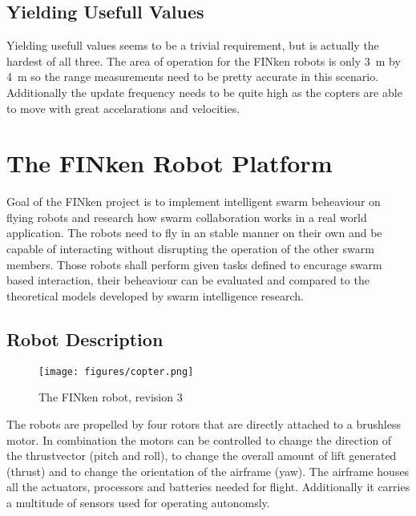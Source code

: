 \subsection{Yielding Usefull Values}
\label{req3}
Yielding usefull values seems to be a trivial requirement, but is actually the hardest of all three.
The area of operation for the FINken robots is only \SI{3}{m} by \SI{4}{m} so the range measurements need to be pretty accurate in this scenario. 
Additionally the update frequency needs to be quite high as the copters are able to move with great accelarations and velocities.


\section{The FINken Robot Platform}


Goal of the FINken project is to implement intelligent swarm beheaviour on flying robots and research how swarm collaboration works in a real world application.
The robots need to fly in an stable manner on their own and be capable of interacting without disrupting the operation of the other swarm members.
Those robots shall perform given tasks defined to encurage swarm based interaction, their beheaviour can be evaluated and compared to the theoretical models developed by swarm intelligence research.

\subsection{Robot Description}
\begin{figure}[H]
	\centering
\texttt{[image: figures/copter.png]}
\label{copterfoto}
\caption{The FINken robot, revision 3}
\end{figure}

The robots are propelled by four rotors that are directly attached to a brushless motor.
In combination the motors can be controlled to change the direction of the thrustvector (pitch and roll), to change the overall amount of lift generated (thrust) and to change the orientation of the airframe (yaw).
The airframe houses all the actuators, processors and batteries needed for flight.
Additionally it carries a multitude of sensors used for operating autonomsly.


